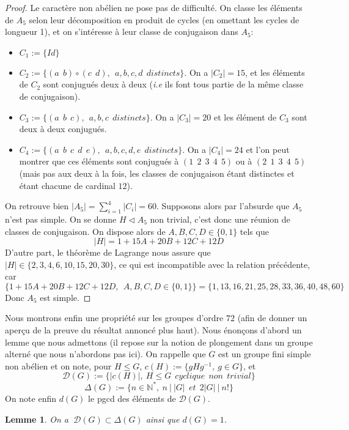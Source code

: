 \documentclass[10pt,a4paper]{article}
\newtheorem{lemma}{Lemme}
\begin{document}
\begin{proof}
    Le caractère non abélien ne pose pas de difficulté. On classe les éléments de $A_5$ selon leur décomposition en produit de cycles (en omettant les cycles de longueur 1), et on s'intéresse à leur classe de conjugaison dans $A_5$:
    \begin{itemize}
        \item $C_1:=\{Id\}$
        \item $C_2:=\{(a \:\:b) \circ (c \:\: d), \:\: a,b,c,d \:\:distincts \}$. On a $|C_2|= 15$, et les éléments de $C_2$ sont conjugués deux à deux (\textit{i.e} ils font tous partie de la même classe de conjugaison).
        \item $C_3:= \{(a \:\: b \:\: c),\:\: a,b,c \:\: distincts\}$. On a $|C_3|= 20$ et les élément de $C_3$ sont deux à deux conjugués.
        \item $C_4 := \{(a \:\: b \:\: c \:\: d \:\: e), \:\: a,b,c,d,e \:\: distincts\}$. On a $|C_4|= 24$ et l'on peut montrer que ces éléments sont conjugués à $(1\:\:2\:\:3\:\:4\:\:5)$ ou à $(2\:\:1\:\:3\:\:4\:\:5)$ (mais pas aux deux à la fois, les classes de conjugaison étant distinctes et étant chacune de cardinal $12$).
    \end{itemize}
    On retrouve bien $|A_5|= \sum_{i=1}^{4}|C_i|=60$. Supposons alors par l'absurde que $A_5$ n'est pas simple. On se donne $ H \triangleleft A_5$ non trivial, c'est donc une réunion de classes de conjugaison. On dispose alors de $A,B,C,D \in \{0,1\}$ tels que
    $$|H| = 1 + 15A + 20B + 12C + 12D$$
    D'autre part, le théorème de Lagrange nous assure que $|H| \in \{2,3,4,6,10,15,20,30\}$, ce qui est incompatible avec la relation précédente, car
    $$\{1 + 15A + 20B + 12C + 12D, \:\: A,B,C,D \in \{0,1\}\}=\{1,13,16,21,25,28,33,36,40,48,60\}$$
    Donc $A_5$ est simple.
\end{proof}

Nous montrons enfin une propriété sur les groupes d'ordre $72$ (afin de donner un aperçu de la preuve du résultat annoncé plus haut). Nous énonçons d'abord un lemme que nous admettons (il repose sur la notion de plongement dans un groupe alterné que nous n'abordons pas ici). On rappelle que $G$ est un groupe fini simple non abélien et on note, pour $H \leq G$, $c(H):=\{gHg^{-1}, \: g \in G\}$, et
$$ \mathcal{D}(G):=\{|c(H)|, \: H \leq G \:\: cyclique\:\: non \:\: trivial\}$$
$$ \Delta(G):=\{n \in \mathbb{N}^*, \: n\:|\:|G| \:\: et \:\: 2|G| \:|\: n!\}$$
On note enfin $d(G)$ le pgcd des éléments de $\mathcal{D}(G)$.
\begin{lemma}
    On a $\:\mathcal{D}(G) \subset \Delta(G)$ ainsi que $d(G) = 1$.
\end{lemma}
\end{document}
